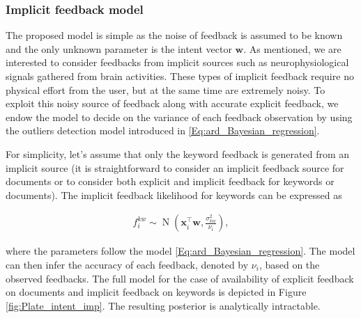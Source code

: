 \documentclass[dissertation,math,vertlayout,pdfa,colorlinks]{aaltoseries}
\newcommand{\bw}{\bm{w}}
\DeclareMathOperator{\normalpdf}{N}
\newcommand{\tp}{^{\top}}
\begin{document}
\subsubsection{Implicit feedback model}

The proposed model is simple as the noise of feedback is assumed to be known and the only unknown parameter is the intent vector $\bw$. As mentioned, we are interested to consider feedbacks from implicit sources such as neurophysiological signals gathered from brain activities. %
These types of implicit feedback require no physical effort from the user, but at the same time are extremely noisy. To exploit this noisy source of feedback along with accurate explicit feedback, we endow the model to decide on the variance of each feedback observation by using the outliers detection model introduced in \ref{Eq:ard_Bayesian_regression}. %

For simplicity, let's assume that only the keyword feedback is generated from an implicit source (it is straightforward to consider an implicit feedback source for documents or to consider both explicit and implicit feedback for keywords or documents). The implicit feedback likelihood for keywords can be expressed as 

\begin{align}\label{Eq:imp_fb_on_kw} 
f_{i}^{kw} \sim \normalpdf(\bm{x}_i\tp\bw,\frac{\sigma_{kw}^2}{\nu_i}),
\end{align}  

\noindent where the parameters follow the model \ref{Eq:ard_Bayesian_regression}. The model can then infer the accuracy of each feedback, denoted by $\nu_i$, based on the observed feedbacks. The full model for the case of availability of explicit feedback on documents and implicit feedback on keywords is depicted in Figure \ref{fig:Plate_intent_imp}. The resulting posterior is analytically intractable.  
\end{document}

